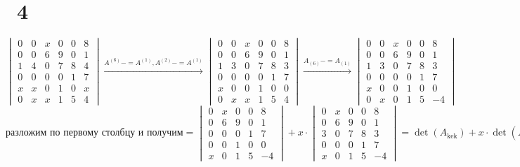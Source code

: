 \documentclass[17pt]{article}
\begin{document}
\section*{\NoWash\ 4}
$$
\begin{vmatrix}
   0 & 0 & x & 0 & 0 & 8\\
   0 & 0 & 6 & 9 & 0 & 1\\
   1 & 4 & 0 & 7 & 8 & 4\\
   0 & 0 & 0 & 0 & 1 & 7\\
   x & x & 0 & 1 & 0 & x\\
   0 & x & x & 1 & 5 & 4
\end{vmatrix}
\xrightarrow{A^{(6)}-=A^{(1)}, A^{(2)}-=A^{(1)}}
\begin{vmatrix}
   0 & 0 & x & 0 & 0 & 8\\
   0 & 0 & 6 & 9 & 0 & 1\\
   1 & 3 & 0 & 7 & 8 & 3\\
   0 & 0 & 0 & 0 & 1 & 7\\
   x & 0 & 0 & 1 & 0 & 0\\
   0 & x & x & 1 & 5 & 4
\end{vmatrix}
\xrightarrow{A_{(6)}-=A_{(1)}}
\begin{vmatrix}
   0 & 0 & x & 0 & 0 & 8\\
   0 & 0 & 6 & 9 & 0 & 1\\
   1 & 3 & 0 & 7 & 8 & 3\\
   0 & 0 & 0 & 0 & 1 & 7\\
   x & 0 & 0 & 1 & 0 & 0\\
   0 & x & 0 & 1 & 5 & -4
\end{vmatrix}
$$
$$
\text{разложим по первому столбцу и получим} 
=
\begin{vmatrix}
   0 & x & 0 & 0 & 8\\
   0 & 6 & 9 & 0 & 1\\
   0 & 0 & 0 & 1 & 7\\
   0 & 0 & 1 & 0 & 0\\
   x & 0 & 1 & 5 & -4
\end{vmatrix}
+ x\cdot
\begin{vmatrix}
   0 & x & 0 & 0 & 8\\
   0 & 6 & 9 & 0 & 1\\
   3 & 0 & 7 & 8 & 3\\
   0 & 0 & 0 & 1 & 7\\
   x & 0 & 1 & 5 & -4
\end{vmatrix}
= \det(A_\text{kek}) + x\cdot \det(A^\text{lol}) 
$$
\end{document}
